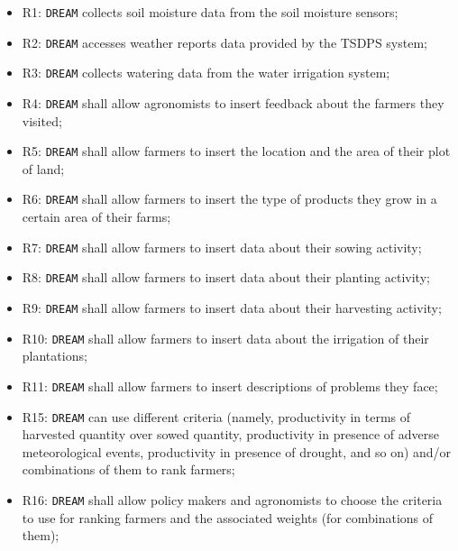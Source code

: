 \documentclass{article}
\begin{document}
\begin{itemize}
    \item R1: \verb|DREAM| collects soil moisture data from the soil moisture sensors;
    \item R2: \verb|DREAM| accesses weather reports data provided by the TSDPS system;

    \item R3: \verb|DREAM| collects watering data from the water irrigation system;

    \item R4: \verb|DREAM| shall allow agronomists to insert feedback about the farmers they visited;

    \item R5: \verb|DREAM| shall allow farmers to insert the location and the area of their plot of land;

    \item R6: \verb|DREAM| shall allow farmers to insert the type of products they grow in a certain area of their farms;

    \item R7: \verb|DREAM| shall allow farmers to insert data about their sowing activity;

    \item R8: \verb|DREAM| shall allow farmers to insert data about their planting activity;
    
    \item R9: \verb|DREAM| shall allow farmers to insert data about their harvesting activity;
    
    \item R10: \verb|DREAM| shall allow farmers to insert data about the irrigation of their plantations;
    
    \item R11: \verb|DREAM| shall allow farmers to insert descriptions of problems they face;
    
    \item R15: \verb|DREAM| can use different criteria (namely, productivity in terms of harvested quantity over sowed quantity, productivity in presence of adverse meteorological events, productivity in presence of drought, and so on) and/or combinations of them to rank farmers;
    
    \item R16: \verb|DREAM| shall allow policy makers and agronomists to choose the criteria to use for ranking farmers and the associated weights (for combinations of them);
    

\end{itemize}
\end{document}
